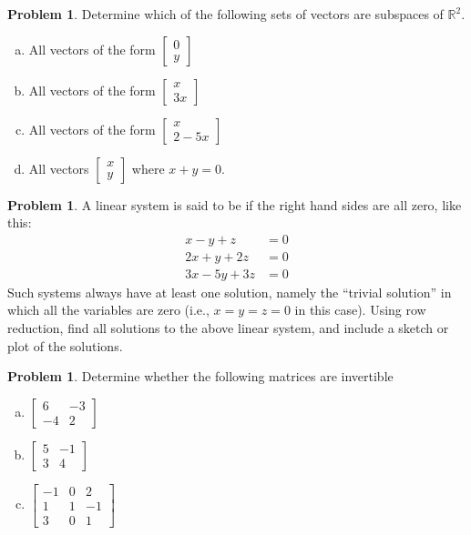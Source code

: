 \documentclass[10pt]{article}
\theoremstyle{definition}
\newtheorem{problem}[theorem]{Problem}
\newcommand{\1}[1]{\textbf{1}_{\left[#1\right]}} %
\def\R{\mathbb{R}} %
\newcommand{\dempfcolor}[1]{{\color{RoyalBlue}#1}}
\newcommand{\demph}[1]{\dempfcolor{{\sl #1}}}
\begin{document}
\begin{problem}
  Determine which of the following sets of vectors are subspaces of $\R^{2}$.
  \begin{enumerate}[(a)]
    \item All vectors of the form $
    \begin{bmatrix}
      0\\y
    \end{bmatrix}
    $
    \item All vectors of the form $
    \begin{bmatrix}
      x\\3x
    \end{bmatrix}
    $
    \item All vectors of the form
    $
    \begin{bmatrix}
      x\\2-5x
    \end{bmatrix}
    $
    \item All vectors $
    \begin{bmatrix}
      x\\y
    \end{bmatrix}
    $
    where $x+y=0$.
  \end{enumerate}
\end{problem}


\begin{problem}
  A linear system is said to be \demph{homogeneous} if the right hand sides are all zero,
  like this:
  \begin{align*}
    x-y+z&=0\\
    2x+y+2z&=0\\
    3x-5y+3z&=0
  \end{align*}
  Such systems always have at least one solution, namely the ``trivial
  solution'' in which all the variables are zero (i.e., $x=y=z=0$ in this
  case). Using row reduction, find all solutions to the above linear system,
  and include a sketch or plot of the solutions.
\end{problem}
\begin{problem}
  Determine whether the following matrices are invertible
  \begin{enumerate}[(a)]
    \item
    $\begin{bmatrix}
      6&-3\\
      -4&2
    \end{bmatrix}$
    \item
    $\begin{bmatrix}
      5&-1\\
      3&4
    \end{bmatrix}$ 
    \item
    $\begin{bmatrix}
      -1&0&2\\
      1&1&-1\\
      3&0&1
    \end{bmatrix}$ 
  \end{enumerate}
\end{problem}
\end{document}
